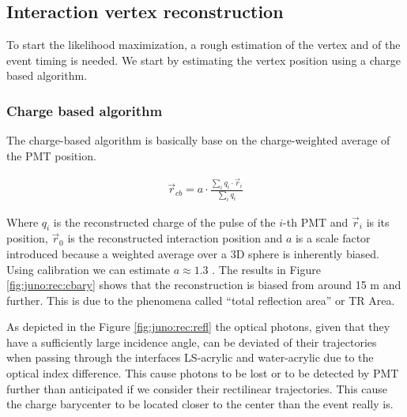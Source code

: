 \documentclass[../main.tex]{subfiles}
\begin{document}
\subsection{Interaction vertex reconstruction}

To start the likelihood maximization, a rough estimation of the vertex and of the event timing is needed. We start by estimating the vertex position using a charge based algorithm.

\subsubsection{Charge based algorithm}

The charge-based algorithm is basically base on the charge-weighted average of the PMT position.

\begin{align}
  \vec{r}_{cb} = a\cdot\frac{\sum_i q_i \cdot \vec{r}_i}{\sum_i q_i}
\end{align}

Where $q_i$ is the reconstructed charge of the pulse of the $i$-th PMT and $\vec{r}_i$ is its position, $\vec{r}_0$ is the reconstructed interaction position and $a$ is a scale factor introduced because a weighted average over a 3D sphere is inherently biased. Using calibration we can estimate $a \approx 1.3$ \cite{li_event_2021}. The results in Figure \ref{fig:juno:rec:cbary} shows that the reconstruction is biased from around 15 m and further. This is due to the phenomena called ``total reflection area'' or TR Area.

As depicted in the Figure \ref{fig:juno:rec:refl} the optical photons, given that they have a sufficiently large incidence angle, can be deviated of their trajectories when passing through the interfaces LS-acrylic and water-acrylic due to the optical index difference. This cause photons to be lost or to be detected by PMT further than anticipated if we consider their rectilinear trajectories. This cause the charge barycenter to be located closer to the center than the event really is.
\end{document}
